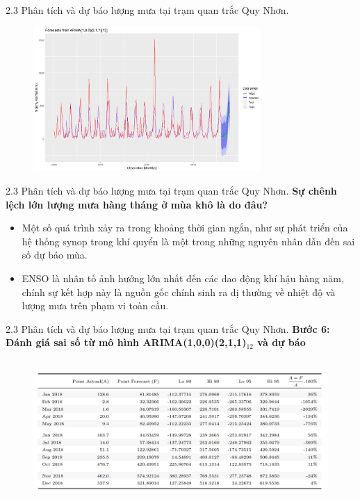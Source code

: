 \documentclass[notheorems,envcountsect,hyperref=unicode]{beamer}
\begin{document}
\begin{frame}{2.3 Phân tích và dự báo lượng mưa tại trạm quan trắc Quy Nhơn.}
	\begin{figure}[!htb]
		\centering
		\includegraphics[width=1\linewidth,height=5.5cm]{V8} 
	\end{figure}
\end{frame}

\begin{frame}{2.3 Phân tích và dự báo lượng mưa tại trạm quan trắc Quy Nhơn.}
	\textbf{Sự chênh lệch lớn lượng mưa hàng tháng ở mùa khô là do đâu?}\\
	\pause
	\begin{itemize}
\item Một số quá trình xảy ra trong khoảng thời gian ngắn, như sự phát triển của hệ thống synop trong khí quyển là một trong những nguyên nhân dẫn đến sai số dự báo mùa.
	\pause 
\item ENSO là nhân tố ảnh hưởng lớn nhất đến các dao động khí hậu hàng năm, chính sự kết hợp này là nguồn gốc chính sinh ra dị thường về nhiệt độ và lượng mưa trên phạm vi toàn cầu.
	\end{itemize}
\end{frame}

\begin{frame}{2.3 Phân tích và dự báo lượng mưa tại trạm quan trắc Quy Nhơn.}
	\textbf{Bước 6: Đánh giá sai số từ mô hình ARIMA(1,0,0)(2,1,1)$_{12}$ và dự báo}\\
	\begin{figure}[!htb]
		\centering
		\includegraphics[width=1\linewidth,height=5.5cm]{duong9} 
	\end{figure}
\end{frame}
\end{document}
